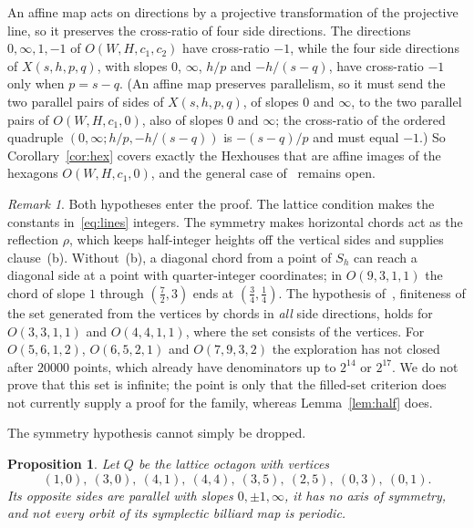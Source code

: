 \documentclass[11pt]{amsart}
\newtheorem{proposition}[theorem]{Proposition}
\theoremstyle{definition}
\theoremstyle{remark}
\newtheorem{remark}[theorem]{Remark}
\begin{document}
An affine map acts on directions by a projective transformation of the projective line, so it preserves the cross-ratio of four side directions. The directions $0,\infty,1,-1$ of $O(W,H,c_1,c_2)$ have cross-ratio $-1$, while the four side directions of $X(s,h,p,q)$, with slopes $0$, $\infty$, $h/p$ and $-h/(s-q)$, have cross-ratio $-1$ only when $p=s-q$. (An affine map preserves parallelism, so it must send the two parallel pairs of sides of $X(s,h,p,q)$, of slopes $0$ and $\infty$, to the two parallel pairs of $O(W,H,c_1,0)$, also of slopes $0$ and $\infty$; the cross-ratio of the ordered quadruple $(0,\infty;h/p,-h/(s-q))$ is $-(s-q)/p$ and must equal $-1$.) So Corollary~\ref{cor:hex} covers exactly the Hexhouses that are affine images of the hexagons $O(W,H,c_1,0)$, and the general case of~\cite[Conjecture~6.1]{ABS25} remains open.

\begin{remark}\label{rem:sharp}
Both hypotheses enter the proof. The lattice condition makes the constants in~\eqref{eq:lines} integers. The symmetry makes horizontal chords act as the reflection $\rho$, which keeps half-integer heights off the vertical sides and supplies clause~(b). Without~(b), a diagonal chord from a point of $S_h$ can reach a diagonal side at a point with quarter-integer coordinates; in $O(9,3,1,1)$ the chord of slope $1$ through $(\frac72,3)$ ends at $(\frac34,\frac14)$. The hypothesis of~\cite[Theorem~3.1]{ALW26}, finiteness of the set generated from the vertices by chords in \emph{all} side directions, holds for $O(3,3,1,1)$ and $O(4,4,1,1)$, where the set consists of the vertices. For $O(5,6,1,2)$, $O(6,5,2,1)$ and $O(7,9,3,2)$ the exploration has not closed after $20000$ points, which already have denominators up to $2^{14}$ or $2^{17}$. We do not prove that this set is infinite; the point is only that the filled-set criterion does not currently supply a proof for the family, whereas Lemma~\ref{lem:half} does.
\end{remark}

The symmetry hypothesis cannot simply be dropped.

\begin{proposition}\label{prop:asym}
Let $Q$ be the lattice octagon with vertices
\[(1,0),\ (3,0),\ (4,1),\ (4,4),\ (3,5),\ (2,5),\ (0,3),\ (0,1).\] Its opposite sides are parallel with slopes $0,\pm1,\infty$, it has no axis of symmetry, and not every orbit of its symplectic billiard map is periodic.
\end{proposition}
\end{document}
